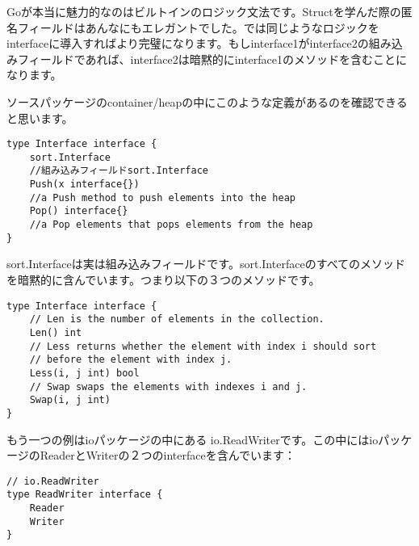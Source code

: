 Goが本当に魅力的なのはビルトインのロジック文法です。Structを学んだ際の匿名フィールドはあんなにもエレガントでした。では同じようなロジックをinterfaceに導入すればより完璧になります。もしinterface1がinterface2の組み込みフィールドであれば、interface2は暗黙的にinterface1のメソッドを含むことになります。

ソースパッケージのcontainer/heapの中にこのような定義があるのを確認できると思います。

\begin{lstlisting}[numbers=none]
type Interface interface {
    sort.Interface
    //組み込みフィールドsort.Interface
    Push(x interface{})
    //a Push method to push elements into the heap
    Pop() interface{}
    //a Pop elements that pops elements from the heap
}
\end{lstlisting}

sort.Interfaceは実は組み込みフィールドです。sort.Interfaceのすべてのメソッドを暗黙的に含んでいます。つまり以下の３つのメソッドです。

\begin{lstlisting}[numbers=none]
type Interface interface {
    // Len is the number of elements in the collection.
    Len() int
    // Less returns whether the element with index i should sort
    // before the element with index j.
    Less(i, j int) bool
    // Swap swaps the elements with indexes i and j.
    Swap(i, j int)
}
\end{lstlisting}

もう一つの例はioパッケージの中にある io.ReadWriterです。この中にはioパッケージのReaderとWriterの２つのinterfaceを含んでいます：

\begin{lstlisting}[numbers=none]
// io.ReadWriter
type ReadWriter interface {
    Reader
    Writer
}
\end{lstlisting}

